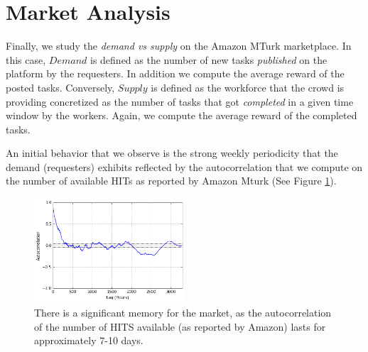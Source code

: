 \section{Market Analysis}
\label{sec:market}
Finally, we study the \emph{demand vs supply} on the Amazon MTurk marketplace.
In this case, $Demand$ is defined as the number of new tasks \emph{published} on the platform by the requesters.
In addition we compute the average reward of the posted tasks.
Conversely, $Supply$ is defined as the workforce that the crowd is providing concretized as the number of tasks that got \emph{completed} in a given time window by the workers.
Again, we compute the average reward of the completed tasks.

An initial behavior  that we observe is  the strong weekly periodicity that the demand (requesters) exhibits reflected by the autocorrelation that we compute on the number of available HITs as reported by Amazon Mturk (See Figure \ref{fig:autocorrelation1}).
\begin{figure}[tb]
	\centering
		\includegraphics[width=0.5\textwidth]{figures/autocorrelation_plot}
	\caption{There is a significant memory for the market, as the autocorrelation of the 
number of HITS available (as reported by Amazon) lasts for approximately 7-10 days.}
	\label{fig:autocorrelation1}
\end{figure}

